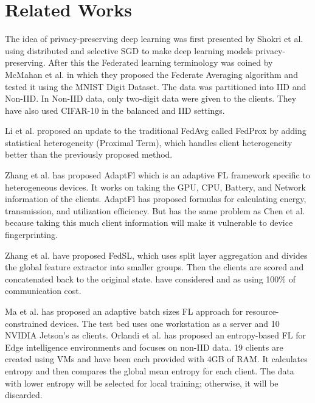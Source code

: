 \documentclass[conference]{IEEEtran}
\begin{document}
\section{Related Works}
The idea of privacy-preserving deep learning was first presented by Shokri et al. \cite{shokri2015privacy} using distributed and selective SGD to make deep learning models privacy-preserving. After this the Federated learning terminology was coined by McMahan et al. \cite{mcmahan2017communication} in which they proposed the Federate Averaging algorithm and tested it using the MNIST Digit Dataset. The data was partitioned into IID and Non-IID. In Non-IID data, only two-digit data were given to the clients. They have also used CIFAR-10 in the balanced and IID settings. 
\par 
Li et al. \cite{li2020federated} proposed an update to the traditional FedAvg called FedProx by adding statistical heterogeneity (Proximal Term), which handles client heterogeneity better than the previously proposed method.\par Zhang et al. \cite{zhang2024adaptfl} has proposed AdaptFl which is an adaptive FL framework specific to heterogeneous devices. It works on taking the GPU, CPU, Battery, and Network information of the clients. AdaptFl has proposed formulas for calculating energy, transmission, and utilization efficiency. But has the same problem as Chen et al. \cite{chen2023boosting} because taking this much client information will make it vulnerable to device fingerprinting. \par
Zhang et al. \cite{zhang2024fedsl} have proposed FedSL, which uses split layer aggregation and divides the global feature extractor into smaller groups. Then the clients are scored and concatenated back to the original state. \cite{zhang2024fedsl} have considered \cite{mcmahan2017communication} and \cite{li2020federated} as using 100\% of communication cost. \par
Ma et al. \cite{ma2021adaptive} has proposed an adaptive batch sizes FL approach for resource-constrained devices. The test bed uses one workstation as a server and 10 NVIDIA Jetson's as clients. Orlandi et al. \cite{orlandi2023entropy} has proposed an entropy-based FL for Edge intelligence environments and focuses on non-IID data. 19 clients are created using VMs and have been each provided with 4GB of RAM. It calculates entropy and then compares the global mean entropy for each client. The data with lower entropy will be selected for local training; otherwise, it will be discarded. \par 
\end{document}
